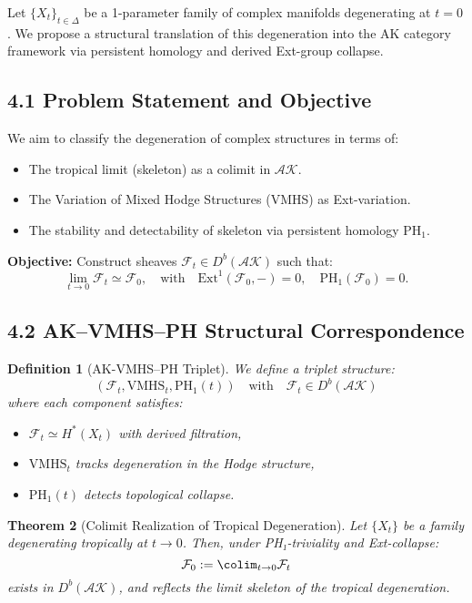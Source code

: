 \documentclass[11pt]{article}
\newtheorem{theorem}{Theorem}[section]
\newtheorem{definition}[theorem]{Definition}
\begin{document}
Let \( \{X_t\}_{t \in \Delta} \) be a 1-parameter family of complex manifolds degenerating at \( t=0 \).  
We propose a structural translation of this degeneration into the AK category framework via persistent homology and derived Ext-group collapse.

\subsection{4.1 Problem Statement and Objective}

We aim to classify the degeneration of complex structures in terms of:

\begin{itemize}
    \item The tropical limit (skeleton) as a colimit in \( \mathcal{AK} \).
    \item The Variation of Mixed Hodge Structures (VMHS) as Ext-variation.
    \item The stability and detectability of skeleton via persistent homology \( \mathrm{PH}_1 \).
\end{itemize}

\textbf{Objective:} Construct sheaves \( \mathcal{F}_t \in D^b(\mathcal{AK}) \) such that:
\[
\lim_{t \to 0} \mathcal{F}_t \simeq \mathcal{F}_0, \quad \text{with} \quad \mathrm{Ext}^1(\mathcal{F}_0, -) = 0, \quad \mathrm{PH}_1(\mathcal{F}_0) = 0.
\]

\subsection{4.2 AK--VMHS--PH Structural Correspondence}

\begin{definition}[AK-VMHS--PH Triplet]
We define a triplet structure:
\[
(\mathcal{F}_t, \mathrm{VMHS}_t, \mathrm{PH}_1(t)) \quad \text{with} \quad \mathcal{F}_t \in D^b(\mathcal{AK})
\]
where each component satisfies:
\begin{itemize}
    \item \( \mathcal{F}_t \simeq H^*(X_t) \) with derived filtration,
    \item \( \mathrm{VMHS}_t \) tracks degeneration in the Hodge structure,
    \item \( \mathrm{PH}_1(t) \) detects topological collapse.
\end{itemize}
\end{definition}

\begin{theorem}[Colimit Realization of Tropical Degeneration]
Let \( \{X_t\} \) be a family degenerating tropically at \( t \to 0 \). Then, under PH₁-triviality and Ext-collapse:
\[
\mathcal{F}_0 := \colim_{t \to 0} \mathcal{F}_t
\]
exists in \( D^b(\mathcal{AK}) \), and reflects the limit skeleton of the tropical degeneration.
\end{theorem}
\end{document}
